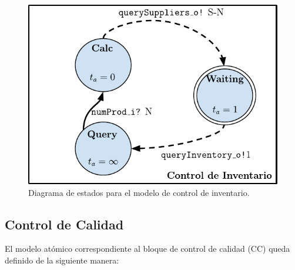 \documentclass[10pt]{article}
\begin{document}
\begin{figure}[h]
	\centering
	\includegraphics{img/controlInventariodevsgraph}
	\caption{Diagrama de estados para el modelo de control de inventario.}
	\label{fig:CI-estados}
\end{figure}
\FloatBarrier

\subsection{Control de Calidad\label{sec:CC}}
El modelo atómico correspondiente al bloque de control de calidad (CC) queda definido de la siguiente manera:
\end{document}
